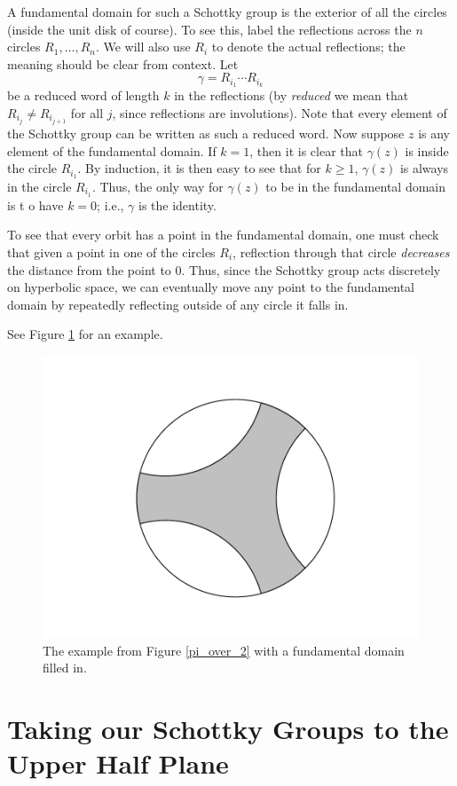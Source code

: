 \documentclass[]{article}
\begin{document}
A fundamental domain for such a Schottky group is the exterior of all the circles (inside the unit disk of course).
To see this, label the reflections across the $n$ circles $R_1, \dots, R_n$.
We will also use $R_i$ to denote the actual reflections; the meaning should be clear from context.
Let
$$
\gamma = R_{i_1}\cdots R_{i_k}
$$
be a reduced word of length $k$ in the reflections (by \textit{reduced} we mean that $R_{i_j} \neq R_{i_{j+1}}$ for all $j$, since reflections are involutions).
Note that every element of the Schottky group can be written as such a reduced word.
Now suppose $z$ is any element of the fundamental domain.
If $k = 1$, then it is clear that $\gamma(z)$ is inside the circle $R_{i_1}$.
By induction, it is then easy to see that for $k \geq 1$, $\gamma(z)$ is always in the circle $R_{i_1}$.
Thus, the only way for $\gamma(z)$ to be in the fundamental domain is t o have $k = 0$; i.e., $\gamma$ is the identity.

To see that every orbit has a point in the fundamental domain, one must check that given a point in one of the circles $R_i$, reflection through that circle \textit{decreases} the distance from the point to $0$.
Thus, since the Schottky group acts discretely on hyperbolic space, we can eventually move any point to the fundamental domain by repeatedly reflecting outside of any circle it falls in.

See Figure \ref{disk_FD} for an example.

\begin{figure}[h]
	\centering
	\includegraphics[trim=110 40 100 50, clip, width=0.6\linewidth]{disk_FD.pdf}
	\caption{The example from Figure \ref{pi_over_2} with a fundamental domain filled in.}
	\label{disk_FD}
\end{figure}

\section*{Taking our Schottky Groups to the Upper Half Plane}
\end{document}

